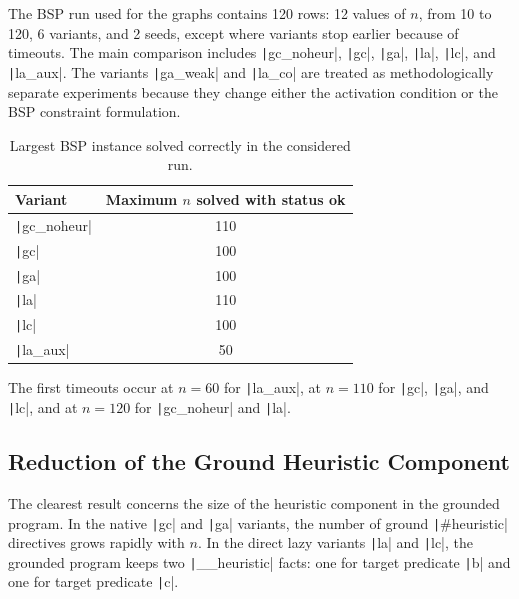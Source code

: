 The BSP run used for the graphs contains 120 rows: 12 values of $n$, from 10 to 120, 6 variants, and 2 seeds, except where variants stop earlier because of timeouts. The main comparison includes \texttt|gc_noheur|, \texttt|gc|, \texttt|ga|, \texttt|la|, \texttt|lc|, and \texttt|la_aux|. The variants \texttt|ga_weak| and \texttt|la_co| are treated as methodologically separate experiments because they change either the activation condition or the BSP constraint formulation.

\begin{table}[H]
\centering
\begin{tabular}{lc}
\toprule
\textbf{Variant} & \textbf{Maximum $n$ solved with status ok}\\
\midrule
\texttt|gc_noheur| & 110\\
\texttt|gc|        & 100\\
\texttt|ga|        & 100\\
\texttt|la|        & 110\\
\texttt|lc|        & 100\\
\texttt|la_aux|    & 50\\
\bottomrule
\end{tabular}
\caption{Largest BSP instance solved correctly in the considered run.}
\label{tab:max-ok}
\end{table}

The first timeouts occur at $n=60$ for \texttt|la_aux|, at $n=110$ for \texttt|gc|, \texttt|ga|, and \texttt|lc|, and at $n=120$ for \texttt|gc_noheur| and \texttt|la|.

\subsection{Reduction of the Ground Heuristic Component}

The clearest result concerns the size of the heuristic component in the grounded program. In the native \texttt|gc| and \texttt|ga| variants, the number of ground \texttt|#heuristic| directives grows rapidly with $n$. In the direct lazy variants \texttt|la| and \texttt|lc|, the grounded program keeps two \texttt|__heuristic| facts: one for target predicate \texttt|b| and one for target predicate \texttt|c|.


